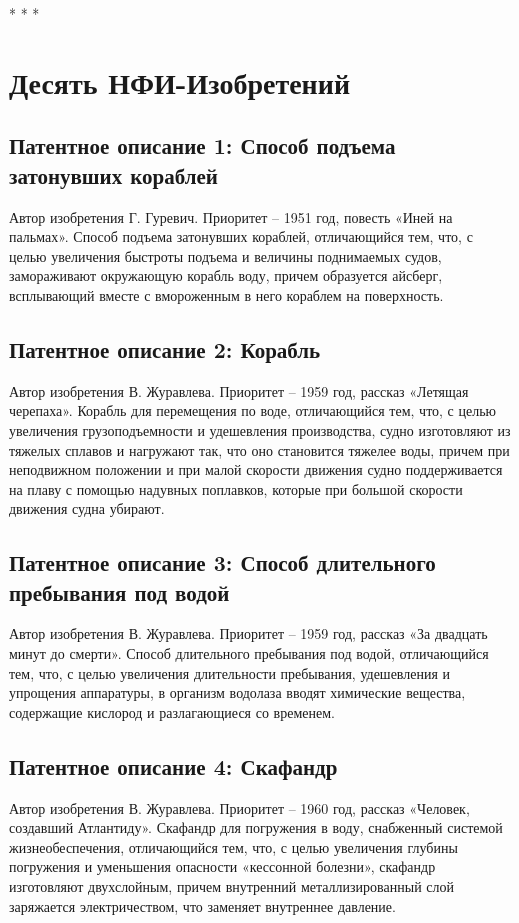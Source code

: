 \documentclass[11pt,a4paper]{article}
\begin{document}
\begin{center}
  * * *
\end{center}
\section*{Десять НФИ-Изобретений}

\subsection*{Патентное описание 1: Способ подъема затонувших кораблей}
Автор изобретения Г. Гуревич. Приоритет -- 1951 год, повесть «Иней на
пальмах».  Способ подъема затонувших кораблей, отличающийся тем, что, с целью
увеличения быстроты подъема и величины поднимаемых судов, замораживают
окружающую корабль воду, причем образуется айсберг, всплывающий вместе с
вмороженным в него кораблем на поверхность.

\subsection*{Патентное описание 2: Корабль}
Автор изобретения В. Журавлева. Приоритет -- 1959 год, рассказ «Летящая
черепаха».  Корабль для перемещения по воде, отличающийся тем, что, с целью
увеличения грузоподъемности и удешевления производства, судно изготовляют из
тяжелых сплавов и нагружают так, что оно становится тяжелее воды, причем при
неподвижном положении и при малой скорости движения судно поддерживается на
плаву с помощью надувных поплавков, которые при большой скорости движения
судна убирают.

\subsection*{Патентное описание 3: Способ длительного пребывания под водой}
Автор изобретения В. Журавлева. Приоритет -- 1959 год, рассказ «За двадцать
минут до смерти».  Способ длительного пребывания под водой, отличающийся тем,
что, с целью увеличения длительности пребывания, удешевления и упрощения
аппаратуры, в организм водолаза вводят химические вещества, содержащие
кислород и разлагающиеся со временем.

\subsection*{Патентное описание 4: Скафандр}
Автор изобретения В. Журавлева. Приоритет -- 1960 год, рассказ «Человек,
создавший Атлантиду».  Скафандр для погружения в воду, снабженный системой
жизнеобеспечения, отличающийся тем, что, с целью увеличения глубины погружения
и уменьшения опасности «кессонной болезни», скафандр изготовляют двухслойным,
причем внутренний металлизированный слой заряжается электричеством, что
заменяет внутреннее давление.
\end{document}
